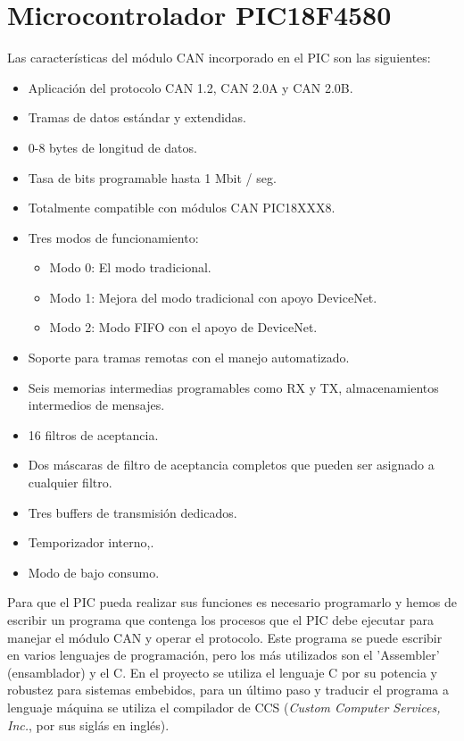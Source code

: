 \section{Microcontrolador PIC18F4580}

Las características del módulo CAN incorporado en el PIC son las siguientes:
\begin{itemize}
	\item Aplicación del protocolo CAN 1.2,
	CAN 2.0A y CAN 2.0B.
	\item Tramas de datos estándar y extendidas.
	\item 0-8 bytes de longitud de datos.
	\item Tasa de bits programable hasta 1 Mbit / seg.
	\item Totalmente compatible con módulos CAN PIC18XXX8.
	\item Tres modos de funcionamiento:
	\begin{itemize}
		\item Modo 0: El modo tradicional.
		\item Modo 1: Mejora del modo tradicional con
		apoyo DeviceNet.
		\item Modo 2: Modo FIFO con el apoyo de DeviceNet.
		\end {itemize}
		\item Soporte para tramas remotas con el manejo automatizado.
		\item  Seis memorias intermedias programables como RX y TX, 
		almacenamientos intermedios de mensajes.
		\item 16 filtros de aceptancia.
		\item Dos máscaras de filtro de aceptancia completos que pueden ser asignado a cualquier filtro.
		\item Tres buffers de transmisión dedicados.
		\item Temporizador interno,\cite{DaP}.
		\item Modo de bajo consumo.
	\end{itemize}

Para que el PIC pueda realizar sus funciones es necesario programarlo y hemos de escribir un programa que contenga los procesos que el PIC debe ejecutar para manejar el módulo CAN y operar el protocolo. Este programa se puede escribir en varios lenguajes de programación, pero los  más utilizados son el ’Assembler’ (ensamblador) y el C. En el proyecto se utiliza el lenguaje C por su potencia y robustez para sistemas embebidos, para un último paso y traducir el programa a lenguaje máquina se utiliza el compilador  de CCS (\textit{Custom Computer Services, Inc.}, por sus siglás en inglés).

